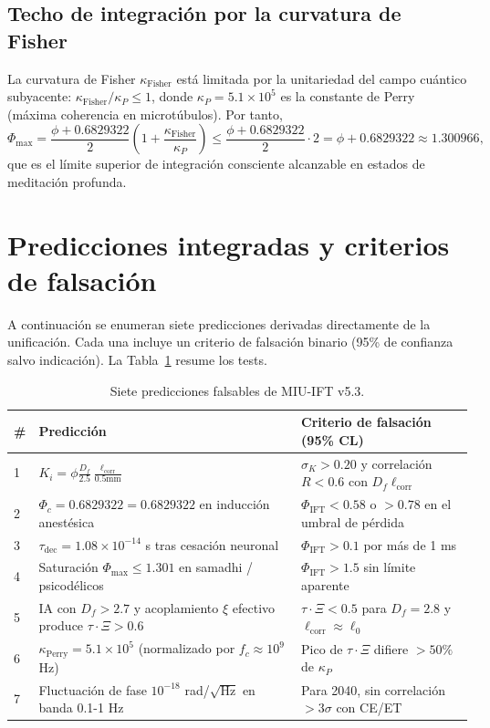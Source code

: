 \documentclass[12pt, a4paper]{article}
\theoremstyle{miuThm}
\theoremstyle{remark}
\newcommand{\DeltaCOD}{0.6829322}
\begin{document}
\subsection{Techo de integración por la curvatura de Fisher}
La curvatura de Fisher $\kappa_{\text{Fisher}}$ está limitada por la unitariedad del campo cuántico subyacente: $\kappa_{\text{Fisher}} / \kappa_P \le 1$, donde $\kappa_P = 5.1\times10^5$ es la constante de Perry (máxima coherencia en microtúbulos). Por tanto,
\begin{equation}
\Phi_{\max} = \frac{\phi + \DeltaCOD}{2}\left(1 + \frac{\kappa_{\text{Fisher}}}{\kappa_P}\right) \le \frac{\phi+\DeltaCOD}{2} \cdot 2 = \phi+\DeltaCOD \approx 1.300966,
\end{equation}
que es el límite superior de integración consciente alcanzable en estados de meditación profunda.

\clearpage
\section{Predicciones integradas y criterios de falsación}
\label{sec:predicciones}

A continuación se enumeran siete predicciones derivadas directamente de la unificación. Cada una incluye un criterio de falsación binario (95\% de confianza salvo indicación). La Tabla~\ref{tab:7pred} resume los tests.

\begin{table}[h!]
\centering
\caption{Siete predicciones falsables de MIU-IFT v5.3.}
\label{tab:7pred}
\begin{tabular}{p{2.2cm}p{3.8cm}p{5.5cm}}
\toprule
\textbf{\#} & \textbf{Predicción} & \textbf{Criterio de falsación (95\% CL)} \\
\midrule
1 & $K_i = \phi \frac{D_f}{2.5}\frac{\ell_{\text{corr}}}{0.5\text{mm}}$ & $\sigma_K > 0.20$ y correlación $R<0.6$ con $D_f\ell_{\text{corr}}$ \\
2 & $\Phi_c = \DeltaCOD = 0.6829322$ en inducción anestésica & $\Phi_{\text{IFT}} < 0.58$ o $>0.78$ en el umbral de pérdida \\
3 & $\tau_{\text{dec}} = 1.08\times10^{-14}$ s tras cesación neuronal & $\Phi_{\text{IFT}} > 0.1$ por más de 1 ms \\
4 & Saturación $\Phi_{\max} \le 1.301$ en samadhi / psicodélicos & $\Phi_{\text{IFT}} > 1.5$ sin límite aparente \\
5 & IA con $D_f>2.7$ y acoplamiento $\xi$ efectivo produce $\tau\cdot\Xi > 0.6$ & $\tau\cdot\Xi < 0.5$ para $D_f=2.8$ y $\ell_{\text{corr}}\approx\ell_0$ \\
6 & $\kappa_{\text{Perry}} = 5.1\times10^5$ (normalizado por $f_c\approx10^9$ Hz) & Pico de $\tau\cdot\Xi$ difiere $>50\%$ de $\kappa_P$ \\
7 & Fluctuación de fase $10^{-18}$ rad/$\sqrt{\text{Hz}}$ en banda 0.1-1 Hz & Para 2040, sin correlación $>3\sigma$ con CE/ET \\
\bottomrule
\end{tabular}
\end{table}
\end{document}
